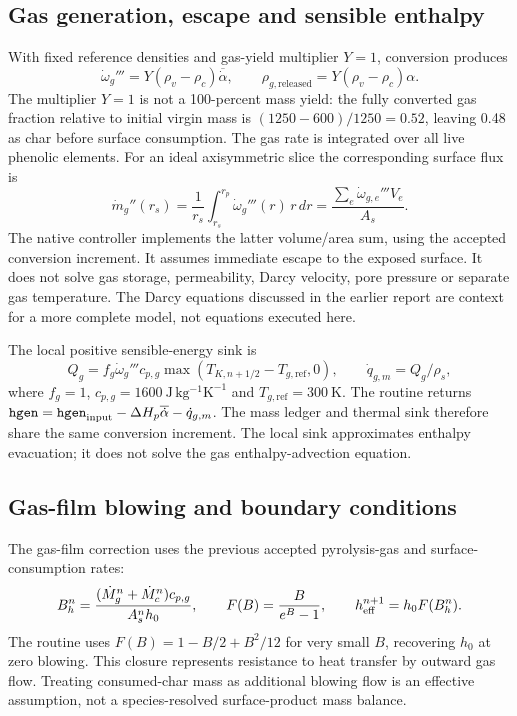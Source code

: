 \documentclass[oneside,openany]{amsdtx}
\begin{document}
\subsection{Gas generation, escape and sensible enthalpy}
With fixed reference densities and gas-yield multiplier $Y=1$, conversion produces
\begin{equation}
 \dot\omega_g'''=Y(\rho_v-\rho_c)\overline{\dot\alpha},\qquad
 \rho_{g,\mathrm{released}}=Y(\rho_v-\rho_c)\alpha.
\end{equation}
The multiplier $Y=1$ is not a 100-percent mass yield: the fully converted gas fraction relative to initial virgin mass is $(1250-600)/1250=0.52$, leaving 0.48 as char before surface consumption. The gas rate is integrated over all live phenolic elements. For an ideal axisymmetric slice the corresponding surface flux is
\begin{equation}
 \dot m_g''(r_s)=\frac{1}{r_s}\int_{r_s}^{r_p}\dot\omega_g'''(r)\,r\,dr
 =\frac{\sum_e\dot\omega_{g,e}'''V_e}{A_s}.
\end{equation}
The native controller implements the latter volume/area sum, using the accepted conversion increment. It assumes immediate escape to the exposed surface. It does not solve gas storage, permeability, Darcy velocity, pore pressure or separate gas temperature. The Darcy equations discussed in the earlier report are context for a more complete model, not equations executed here.

The local positive sensible-energy sink is
\begin{equation}
 Q_g=f_g\dot\omega_g'''c_{p,g}\max(T_{K,n+1/2}-T_{g,\mathrm{ref}},0),
 \qquad \dot q_{g,m}=Q_g/\rho_s,
\end{equation}
where $f_g=1$, $c_{p,g}=1600\ \mathrm{J\,kg^{-1}K^{-1}}$ and $T_{g,\mathrm{ref}}=300\ \mathrm K$. The routine returns $\texttt{hgen}=\texttt{hgen}_{\rm input}-\Delta H_p\overline{\dot\alpha}-\dot q_{g,m}$. The mass ledger and thermal sink therefore share the same conversion increment. The local sink approximates enthalpy evacuation; it does not solve the gas enthalpy-advection equation.

\subsection{Gas-film blowing and boundary conditions}
The gas-film correction uses the previous accepted pyrolysis-gas and surface-consumption rates:
\begin{equation}
 B_h^n=\frac{(\dot M_g^n+\dot M_c^n)c_{p,g}}{A_s^n h_0},\qquad
 F(B)=\frac{B}{e^B-1},\qquad h_{\rm eff}^{n+1}=h_0F(B_h^n).
\end{equation}
The routine uses $F(B)=1-B/2+B^2/12$ for very small $B$, recovering $h_0$ at zero blowing. This closure represents resistance to heat transfer by outward gas flow. Treating consumed-char mass as additional blowing flow is an effective assumption, not a species-resolved surface-product mass balance.
\end{document}
